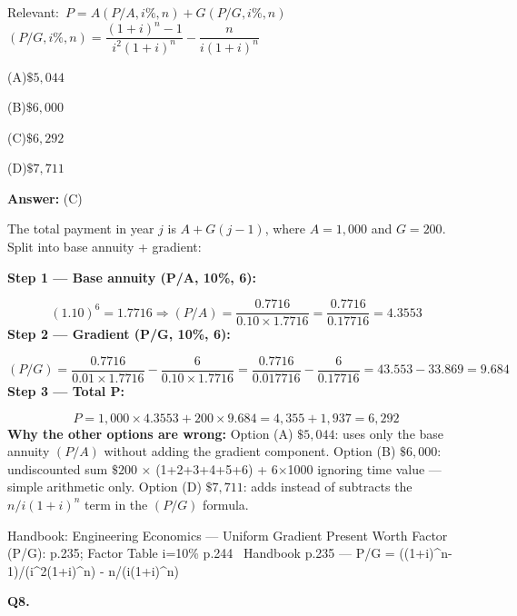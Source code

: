 \documentclass[11pt]{article}
\newcommand{\correct}[1]{\textbf{#1}\;{\color{accent}$\checkmark$}}
\newcommand{\optline}[2]{\par\noindent\hspace{1.2em}(#1)\hspace{0.6em}#2}
\begin{document}
{\small\color{soft}Relevant:}\ $P = A(P/A, i\%, n) + G(P/G, i\%, n)$ \quad $(P/G, i\%, n) = \dfrac{(1+i)^n - 1}{i^2(1+i)^n} - \dfrac{n}{i(1+i)^n}$\par\vspace{3pt}
\optline{A}{$\$5{,}044$}
\optline{B}{$\$6{,}000$}
\optline{C}{\correct{$\$6{,}292$}}
\optline{D}{$\$7{,}711$}
\par\vspace{3pt}
\vspace{2pt}\par\noindent\colorbox{boxbg}{\parbox{\dimexpr\linewidth-2\fboxsep\relax}{%
\vspace{2pt}\textbf{Answer:} (C)\par\vspace{2pt}
{\small The total payment in year $j$ is $A + G(j-1)$, where $A = 1{,}000$ and $G = 200$. Split into base annuity + gradient:\par
\textbf{Step 1 --- Base annuity (P/A, 10\%, 6):}\par
\[(1.10)^6 = 1.7716 \Rightarrow (P/A) = \frac{0.7716}{0.10 \times 1.7716} = \frac{0.7716}{0.17716} = 4.3553\]
\textbf{Step 2 --- Gradient (P/G, 10\%, 6):}\par
\[(P/G) = \frac{0.7716}{0.01 \times 1.7716} - \frac{6}{0.10 \times 1.7716} = \frac{0.7716}{0.017716} - \frac{6}{0.17716} = 43.553 - 33.869 = 9.684\]
\textbf{Step 3 --- Total P:}\par
\[P = 1{,}000 \times 4.3553 + 200 \times 9.684 = 4{,}355 + 1{,}937 = 6{,}292\]
\textbf{Why the other options are wrong:} Option (A) $\$5{,}044$: uses only the base annuity $(P/A)$ without adding the gradient component. Option (B) $\$6{,}000$: undiscounted sum $\$200$ $\times$ (1+2+3+4+5+6) + 6$\times$1000 ignoring time value --- simple arithmetic only. Option (D) $\$7{,}711$: adds instead of subtracts the $n/i(1+i)^n$ term in the $(P/G)$ formula.\par}\par\vspace{2pt}
{\footnotesize\color{soft}Handbook: Engineering Economics --- Uniform Gradient Present Worth Factor (P/G): p.235; Factor Table i=10\% p.244 \textbullet\ Handbook p.235 --- P/G = ((1+i)\textasciicircum{}n-1)/(i\textasciicircum{}2(1+i)\textasciicircum{}n) - n/(i(1+i)\textasciicircum{}n)}\vspace{2pt}
}}
\vspace{9pt}
\filbreak
\textbf{\color{accent}Q8.}\par\vspace{2pt}
\end{document}
